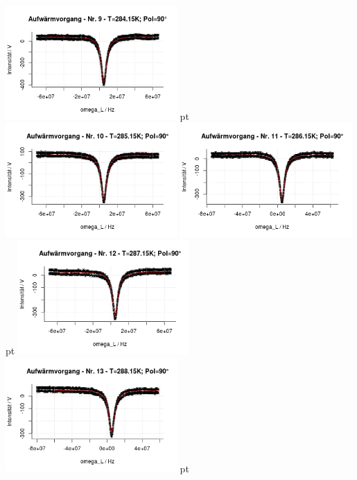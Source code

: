 \documentclass[12pt]{article}
\begin{document}
\begin{minipage}[h!]{\textwidth}
	{\centering
		
		\includegraphics[width=0.49\textwidth]{figures/warm90-9.png} pt
		\includegraphics[width=0.49\textwidth]{figures/warm90-10.png}\vskip -10pt
		\includegraphics[width=0.49\textwidth]{figures/warm90-11.png} pt
		\includegraphics[width=0.49\textwidth]{figures/warm90-12.png}\vskip -10pt	\includegraphics[width=0.49\textwidth]{figures/warm90-13.png} pt
}
\end{minipage}
\end{document}
